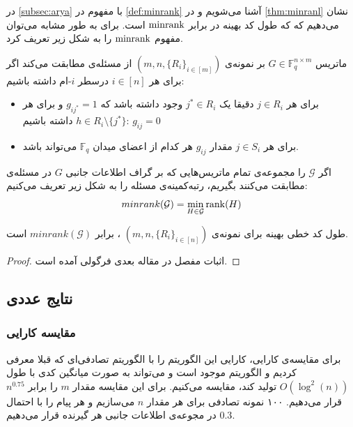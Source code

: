 در
\autoref{subsec:arya}
با مفهوم
در
\autoref{def:minrank}
آشنا می‌شویم و در
\autoref{thm:minranl}
نشان می‌دهیم که که طول کد بهینه در
\icod
برابر 
$\mathrm{minrank}$
است. برای
\picod
به طور مشابه می‌توان مفهوم
$\mathrm{minrank}$
را به شکل زیر تعریف کرد.
\begin{definition}
	ماتریس
	$G \in \mathbb{F}^{n\times m}_q$
	بر نمونه‌ی
		$(m, n, \{R_i\}_{i \in [m]})$
		از مسئله‌ی
	\picod
	مطابقت می‌کند اگر برای هر
	$i \in [n]$
	درسطر 
	$i$-ام
	داشته باشیم:
	\begin{itemize}
		\item
		برای هر
		$j \in R_i$
		دقیقا یک
		$j^\ast \in R_i$
		وجود داشته باشد که 
		$g_{i j^\ast}= 1$
		و برای هر
		$h \in R_i \setminus \{j^\ast\}$
		داشته باشیم:
		$g_{i j} = 0$ 
		\item
		برای هر
		$j \in S_i$
		مقدار
		$g_{i j}$
		هر کدام از اعضای میدان
		$\mathbb{F}_q$
		می‌تواند باشد.
	\end{itemize}
\end{definition}
\begin{definition}
	اگر
	$\mathcal{G}$
	را مجموعه‌ی تمام ماتریس‌هایی که بر گراف اطلاعات جانبی 	$G$ در مسئله‌ی
	\picod
	مطابقت می‌کنند بگیریم، رتبه‌کمینه‌ی مسئله را به شکل زیر تعریف می‌کنیم:
	$$minrank(\mathcal{G}) = \min_{H \in \mathcal{G}} \operatorname{rank}(H)$$
	
\end{definition}
\begin{theorem}
	\label{theorem:pliable2016:theorem3}
	طول کد خطی بهینه برای نمونه‌ی
	$(m, n, \{R_i\}_{i \in [n]})$
	،
	\picod
	برابر
	$minrank(\mathcal{G})$
	است.
\end{theorem}
\begin{proof}
	اثبات مفصل در مقاله  بعدی فرگولی 
	\cite{song2016deterministic}
	آمده است.
\end{proof}

\subsection{
نتایج عددی
}
\subsubsection{
مقایسه کارایی
}
برای مقایسه‌ی کارایی، کارایی این الگوریتم را با الگوریتم تصادفی‌ای که قبلا معرفی کردیم و  الگوریتم موجود است و می‌تواند به صورت میانگین کدی با طول
$O(\log^2(n))$
تولید کند، مقایسه می‌کنیم. برای این مقایسه مقدار
$m$
را برابر
$n^{0.75}$
قرار می‌دهیم. ۱۰۰ نمونه تصادفی برای هر مقدار
$n$
می‌سازیم و هر پیام را با احتمال
$0.3$
در مجوعه‌ی اطلاعات جانبی هر گیرنده قرار می‌دهیم.

